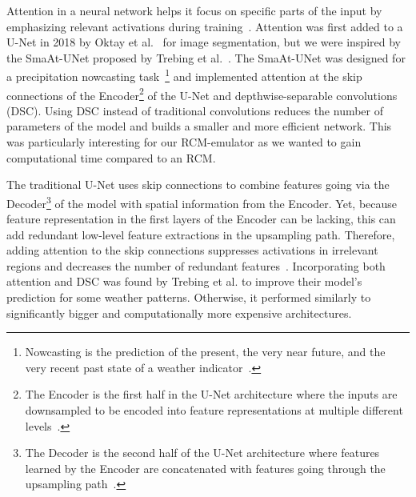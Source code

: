 \documentclass[a4paper,11pt,oneside]{report}
\begin{document}
\begin{itemize}
\begin{itemize}
        Attention in a neural network helps it focus on specific parts of the input by emphasizing relevant activations during training~\cite{Sanghyun2018, AttentionUNet}. Attention was first added to a U-Net in 2018 by Oktay et al.~\cite{ Oktay2018} for image segmentation, but we were inspired by the SmaAt-UNet proposed by Trebing et al.~\cite{smatunet}. The SmaAt-UNet was designed for a precipitation nowcasting task~\footnote{Nowcasting is the prediction of the present, the very near future, and the very recent past state of a weather indicator~\cite{Nowcasting}.} and implemented attention at the skip connections of the Encoder\footnote{The Encoder is the first half in the U-Net architecture where the inputs are downsampled to be encoded into feature representations at multiple different levels~\cite{Encoder}.} of the U-Net and depthwise-separable convolutions (DSC). Using DSC instead of traditional convolutions reduces the number of parameters of the model and builds a smaller and more efficient network. This was particularly interesting for our RCM-emulator as we wanted to gain computational time compared to an RCM. 
        
        The traditional U-Net uses skip connections to combine features going via the Decoder\footnote{The Decoder is the second half of the U-Net architecture where features learned by the Encoder are concatenated with features going through the upsampling path~\cite{Encoder}.} of the model with spatial information from the Encoder. Yet, because feature representation in the first layers of the Encoder can be lacking, this can add redundant low-level feature extractions in the upsampling path. Therefore, adding attention to the skip connections suppresses activations in irrelevant regions and decreases the number of redundant features~\cite{AttentionUNet}.
        Incorporating both attention and DSC was found by Trebing et al. to improve their model's prediction for some weather patterns. Otherwise, it performed similarly to significantly bigger and computationally more expensive architectures. 

    \end{itemize}
    

\end{itemize}
\end{document}
